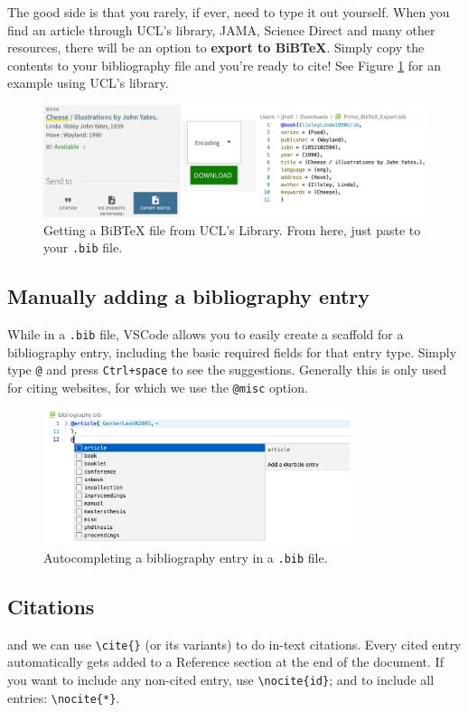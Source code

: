 The good side is that you rarely, if ever, need to type it out yourself.
When you find an article through UCL's library, JAMA, Science Direct and many other resources, there will be an option to \textbf{export to BiBTeX}.
Simply copy the contents to your bibliography file and you're ready to cite!
See Figure \ref{fig:ucl-lib} for an example using UCL's library.
\begin{figure}[h]
  \centering
  \includegraphics[width=\textwidth]{figures/ucl-lib.png}
  \caption{Getting a BiBTeX file from UCL's Library. From here, just paste to your \texttt{.bib} file.}
  \label{fig:ucl-lib}
\end{figure}

\subsection{Manually adding a bibliography entry}
While in a \verb|.bib| file, VSCode allows you to easily create a scaffold for a bibliography entry, including the basic required fields for that entry type.
Simply type \verb|@| and press \verb|Ctrl+space| to see the suggestions.
Generally this is only used for citing websites, for which we use the \verb|@misc| option.
\begin{figure}[h]
  \centering
    \includegraphics[width=0.8\textwidth]{figures/bib-entry.png}
  \caption{Autocompleting a bibliography entry in a \texttt{.bib} file.}
  \label{fig:bib-entry}
\end{figure}

\subsection{Citations}
and we can use \verb|\cite{}| (or its variants) to do in-text citations.
Every cited entry automatically gets added to a Reference section at the end of the document.
If you want to include any non-cited entry, use \verb|\nocite{id}|; and to include all entries: \verb|\nocite{*}|.


